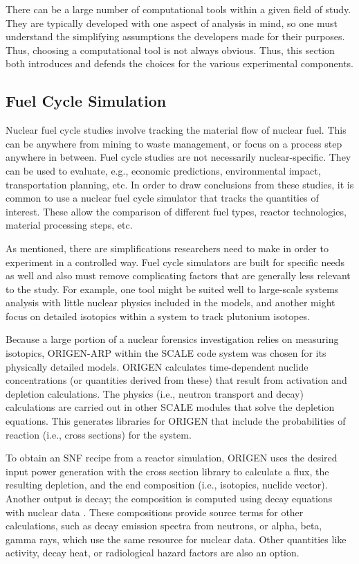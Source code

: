 There can be a large number of computational tools within a given field of
study.  They are typically developed with one aspect of analysis in mind, so
one must understand the simplifying assumptions the developers made for their
purposes. Thus, choosing a computational tool is not always obvious. Thus, this
section both introduces and defends the choices for the various experimental
components.

\subsection{Fuel Cycle Simulation}

Nuclear fuel cycle studies involve tracking the material flow of nuclear fuel.
This can be anywhere from mining to waste management, or focus on a process
step anywhere in between. Fuel cycle studies are not necessarily
nuclear-specific. They can be used to evaluate, e.g., economic predictions,
environmental impact, transportation planning, etc.  In order to draw
conclusions from these studies, it is common to use a nuclear fuel cycle
simulator that tracks the quantities of interest. These allow the comparison of
different fuel types, reactor technologies, material processing steps, etc. 

As mentioned, there are simplifications researchers need to make in order to
experiment in a controlled way. Fuel cycle simulators are built for specific
needs as well and also must remove complicating factors that are generally less
relevant to the study.  For example, one tool might be suited well to
large-scale systems analysis with little nuclear physics included in the
models, and another might focus on detailed isotopics within a system to track
plutonium isotopes.


Because a large portion of a nuclear forensics investigation relies on
measuring isotopics, \gls{ORIGEN-ARP} \cite{origen} within the SCALE code
system was chosen for its physically detailed models. \gls{ORIGEN} calculates
time-dependent nuclide concentrations (or quantities derived from these) that
result from activation and depletion calculations. The physics (i.e., neutron
transport and decay) calculations are carried out in other SCALE modules that
solve the depletion equations.  This generates libraries for \gls{ORIGEN} that
include the probabilities of reaction (i.e., cross sections) for the system.

To obtain an \gls{SNF} recipe from a reactor simulation, \gls{ORIGEN} uses the
desired input power generation with the cross section library to calculate a
flux, the resulting depletion, and the end composition (i.e., isotopics,
nuclide vector).  Another output is decay; the composition is computed using
decay equations with nuclear data \cite{endf}. These compositions provide
source terms for other calculations, such as decay emission spectra from
neutrons, or alpha, beta, gamma rays, which use the same resource for nuclear
data. Other quantities like activity, decay heat, or radiological hazard
factors are also an option.

